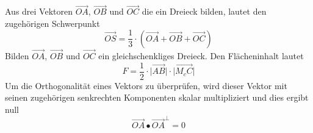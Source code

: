 Aus drei Vektoren $\overrightarrow{OA}$, $\overrightarrow{OB}$ und $\overrightarrow{OC}$ die ein Dreieck bilden, lautet den zugehörigen Schwerpunkt
\begin{equation}
\boxed{\overrightarrow{OS}=\dfrac{1}{3}\cdot\left(\overrightarrow{OA}+\overrightarrow{OB}+\overrightarrow{OC}\right)}
\end{equation}
Bilden $\overrightarrow{OA}$, $\overrightarrow{OB}$ und $\overrightarrow{OC}$ ein gleichschenkliges Dreieck. Den Flächeninhalt lautet
\begin{equation}
\boxed{F=\dfrac{1}{2}\cdot \Big\vert\overrightarrow{AB}\Big\vert\cdot \Big\vert\overrightarrow{M_cC}\Big\vert}
\end{equation}
Um die Orthogonalität eines Vektors zu überprüfen, wird dieser Vektor mit seinen zugehörigen senkrechten Komponenten skalar multipliziert und dies ergibt null
\begin{equation}
\boxed{\overrightarrow{OA}\bullet \overrightarrow{OA}^{\perp}=0}
\end{equation}
